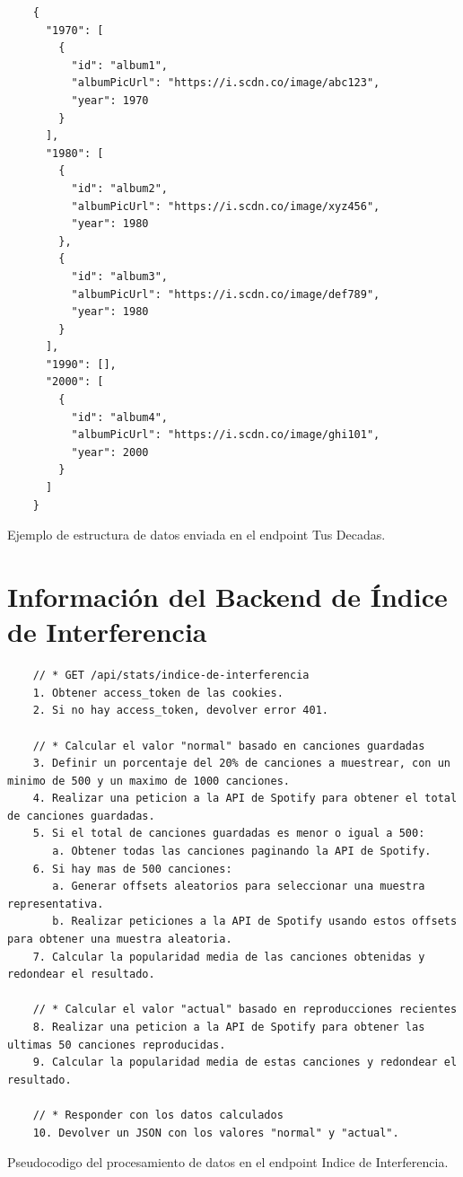 \begin{ifalgorithm}[H]
  \begin{lstlisting}
    {
      "1970": [
        {
          "id": "album1",
          "albumPicUrl": "https://i.scdn.co/image/abc123",
          "year": 1970
        }
      ],
      "1980": [
        {
          "id": "album2",
          "albumPicUrl": "https://i.scdn.co/image/xyz456",
          "year": 1980
        },
        {
          "id": "album3",
          "albumPicUrl": "https://i.scdn.co/image/def789",
          "year": 1980
        }
      ],
      "1990": [],
      "2000": [
        {
          "id": "album4",
          "albumPicUrl": "https://i.scdn.co/image/ghi101",
          "year": 2000
        }
      ]
    }
    \end{lstlisting}
  \caption{Ejemplo de estructura de datos enviada en el endpoint Tus Decadas.}
  \label{alg:tus_decadas_response}
\end{ifalgorithm}

\section{Información del Backend de Índice de Interferencia} \label{sec:backend_indice_de_interferencia}

\begin{ifalgorithm}[H]
  \begin{lstlisting}
    // * GET /api/stats/indice-de-interferencia
    1. Obtener access_token de las cookies.
    2. Si no hay access_token, devolver error 401.

    // * Calcular el valor "normal" basado en canciones guardadas
    3. Definir un porcentaje del 20% de canciones a muestrear, con un minimo de 500 y un maximo de 1000 canciones.
    4. Realizar una peticion a la API de Spotify para obtener el total de canciones guardadas.
    5. Si el total de canciones guardadas es menor o igual a 500:
       a. Obtener todas las canciones paginando la API de Spotify.
    6. Si hay mas de 500 canciones:
       a. Generar offsets aleatorios para seleccionar una muestra representativa.
       b. Realizar peticiones a la API de Spotify usando estos offsets para obtener una muestra aleatoria.
    7. Calcular la popularidad media de las canciones obtenidas y redondear el resultado.

    // * Calcular el valor "actual" basado en reproducciones recientes
    8. Realizar una peticion a la API de Spotify para obtener las ultimas 50 canciones reproducidas.
    9. Calcular la popularidad media de estas canciones y redondear el resultado.

    // * Responder con los datos calculados
    10. Devolver un JSON con los valores "normal" y "actual".
    \end{lstlisting}
  \caption{Pseudocodigo del procesamiento de datos en el endpoint Indice de Interferencia.}
  \label{alg:indice_interferencia}
\end{ifalgorithm}

